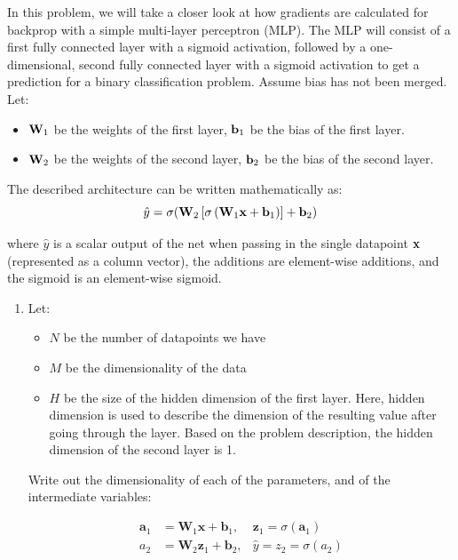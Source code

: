\documentclass[submit]{harvardml}
\begin{document}
\newpage
\begin{problem}

  In this problem, we will take a closer look at how gradients are calculated for backprop with a simple multi-layer perceptron (MLP). The MLP will consist of a first fully connected layer with a sigmoid activation, followed by a one-dimensional, second fully connected layer with a sigmoid activation to get a prediction for a binary classification problem. Assume bias has not been merged. Let:
  \begin{itemize}
      \item $\bold{W}_1$ be the weights of the first layer, $\bold{b}_1$ be the bias of the first layer.
      \item $\bold{W}_2$ be the weights of the second layer, $\bold{b}_2$ be the bias of the second layer.
  \end{itemize}
  
  The described architecture can be written mathematically as: $$\hat{y} = \sigma(\bold{W}_2 \left[\sigma \left(\bold{W}_1 \bold{x} + \bold{b}_1\right)\right] + \bold{b}_2)$$
  
  where $\hat{y}$ is a scalar output of the net when passing in the single datapoint $\bold{x}$ (represented as a column vector), the additions are element-wise additions, and the sigmoid is an element-wise sigmoid.
  
  \begin{enumerate}
      \item Let:
      \begin{itemize}
          \item $N$ be the number of datapoints we have
          \item $M$ be the dimensionality of the data
          \item $H$ be the size of the hidden dimension of the first layer. Here, hidden dimension is used to describe the dimension of the resulting value after going through the layer. Based on the problem description, the hidden dimension of the second layer is 1.
      \end{itemize}
      
      Write out the dimensionality of each of the parameters, and of the intermediate variables:

          \begin{align*}
          \mathbf{a}_1 &= \mathbf{W}_1 \mathbf{x} + \mathbf{b}_1, 
          &\mathbf{z}_1 = \sigma(\mathbf{a}_1) \\
          a_2 &= \mathbf{W}_2 \mathbf{z}_1 + \mathbf{b}_2, 
          &\hat{y} = z_2 = \sigma(a_2)
          \end{align*}
          

\end{enumerate}
\end{problem}
\end{document}

